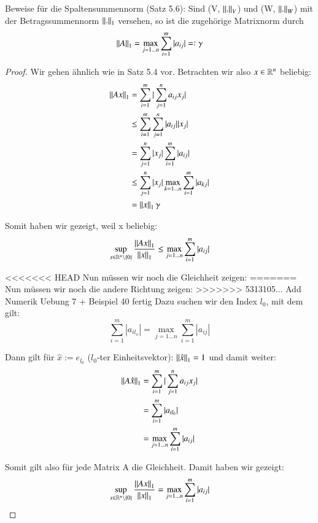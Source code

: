 \begin{exercise}
Beweise für die Spaltensummennorm (Satz 5.6): Sind (V, $\left\lVert.\right\rVert_V$) und (W, $\left\lVert.\right\rVert_W$) mit der Betragssummennorm $\left\lVert.\right\rVert_1$ versehen, so ist die zugehörige Matrixnorm  durch 
\begin{equation*}
\left\lVert A\right\rVert_1 = \max_{j=1...n} \sum_{i=1}^{m} | a_{ij} | =: \gamma
\end{equation*}
\end{exercise}

\begin{proof}
Wir gehen ähnlich wie in Satz 5.4 vor. Betrachten wir also $x \in \mathbb{R}^n$ beliebig:
\begin{equation*}
\begin{split}
\left\lVert Ax\right\rVert_1 & = \sum_{i=1}^{m} | \sum_{j=1}^{n} a_{ij} x_j | \\ 
& \le \sum_{i=1}^{m} \sum_{j=1}^{n} | a_{ij} | | x_j | \\
& = \sum_{j=1}^{n} | x_j | \sum_{i=1}^{m} | a_{ij} | \\
& \le \sum_{j=1}^{n} | x_j | \max_{k=1...n} \sum_{i=1}^{m} | a_{kj} | \\
& = \left\lVert x\right\rVert_1 \gamma
\end{split}
\end{equation*}

Somit haben wir gezeigt, weil x beliebig:
\begin{equation*}
\sup_{x \in \mathbb{R}^n \backslash \{0\}} \frac{\left\lVert Ax\right\rVert_1}{\left\lVert x\right\rVert_1} \le \max_{j=1...n} \sum_{i=1}^{m} | a_{ij} |
\end{equation*}


<<<<<<< HEAD
Nun müssen wir noch die Gleichheit zeigen:
=======
Nun müssen wir noch die andere Richtung zeigen:
>>>>>>> 5313105... Add Numerik Uebung 7 + Beispiel 40 fertig
Dazu suchen wir den Index $l_0$, mit dem gilt:
\begin{equation*}
\sum_{i=1}^{m} | a_{il_o} | = \max_{j=1...n} \sum_{i=1}^{m} | a_{ij} |
\end{equation*}

Dann gilt für $\hat{x} := e_{l_0}$ ($l_0$-ter Einheitsvektor): $\left\lVert\hat{x}\right\rVert_1 = 1$ und damit weiter:
\begin{equation*}
\begin{split}
\left\lVert A\hat{x}\right\rVert_1 & = \sum_{i=1}^{m} | \sum_{j=1}^{n} a_{ij} x_j | \\ 
& = \sum_{i=1}^{m} | a_{il_0} | \\
& = \max_{j=1...n} \sum_{i=1}^{m} | a_{ij} | \\
\end{split}
\end{equation*}

Somit gilt also für jede Matrix A die Gleichheit. Damit haben wir gezeigt:
\begin{equation*}
\sup_{x \in \mathbb{R}^n \backslash \{0\}} \frac{\left\lVert Ax\right\rVert_1}{\left\lVert x\right\rVert_1} = \max_{j=1...n} \sum_{i=1}^{m} | a_{ij} |
\end{equation*}

\end{proof}
